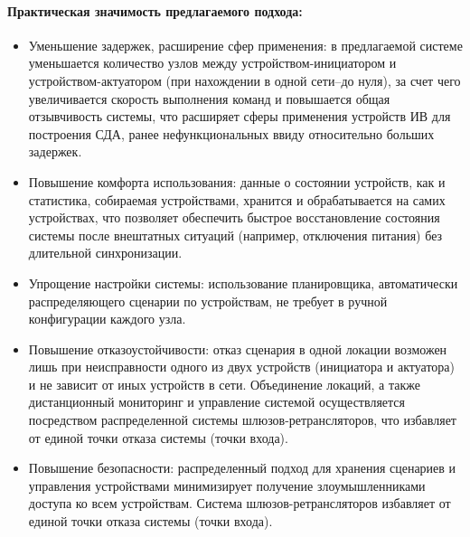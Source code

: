 \documentclass[14pt,a4paper]{extarticle}
\begin{document}
\paragraph{Практическая значимость предлагаемого подхода:}
\begin{itemize}
    \item Уменьшение задержек, расширение сфер применения: в предлагаемой системе уменьшается количество узлов между устройством-инициатором и устройством-актуатором (при нахождении в
    одной сети--до нуля), за счет чего увеличивается скорость выполнения команд и повышается общая отзывчивость системы, что расширяет сферы применения устройств ИВ для построения
    СДА, ранее нефункциональных ввиду относительно больших задержек.

    \item Повышение комфорта использования: данные о состоянии устройств, как и статистика, собираемая устройствами, хранится и обрабатывается на самих устройствах, что позволяет
    обеспечить быстрое восстановление состояния системы после внештатных ситуаций (например, отключения питания) без длительной синхронизации.

    \item Упрощение настройки системы: использование планировщика, автоматически распределяющего сценарии по устройствам, не требует в ручной конфигурации каждого узла.
    
    \item Повышение отказоустойчивости: отказ сценария в одной локации возможен лишь при неисправности одного из двух устройств (инициатора и актуатора) и не зависит от иных устройств
    в сети. Объединение локаций, а также дистанционный мониторинг и управление системой осуществляется посредством распределенной системы шлюзов-ретрансляторов, что избавляет от
    единой точки отказа системы (точки входа).
    
    \item Повышение безопасности: распределенный подход для хранения сценариев и управления устройствами минимизирует получение злоумышленниками доступа ко всем устройствам. Система
    шлюзов-ретрансляторов избавляет от единой точки отказа системы (точки входа).

\end{itemize}
\end{document}
